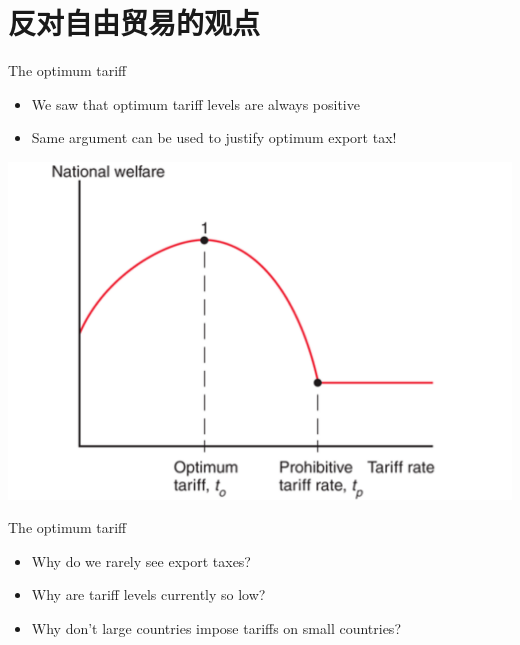 \documentclass[10pt,hyperref={CJKbookmarks=true},xcolor=dvipsnames,aspectratio=169]{beamer}
\begin{document}
\section{反对自由贸易的观点}
\begin{frame}{The optimum tariff}
\begin{itemize}
\item We saw that optimum tariff levels are always positive
\item Same argument can be used to justify optimum export tax!
\end{itemize}
\centering \includegraphics[scale=0.20]{fig/politic/optimum_tariff.png}
\end{frame}


\begin{frame}{The optimum tariff}
\begin{itemize}
\item Why do we rarely see export taxes?
\item Why are tariff levels currently so low?
\item Why don't large countries impose tariffs on small countries?
\end{itemize}
\end{frame}
\end{document}
